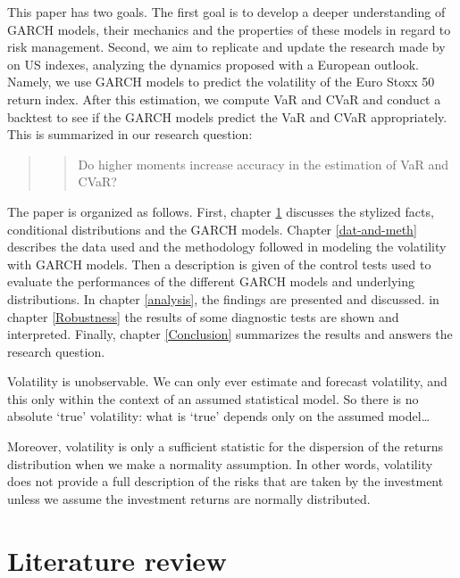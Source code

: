 \documentclass[a4paper, nobind]{templates/ociamthesis}
\begin{document}
\noindent This paper has two goals. The first goal is to develop a deeper understanding of GARCH models, their mechanics and the properties of these models in regard to risk management. Second, we aim to replicate and update the research made by \textcite{bali2008} on US indexes, analyzing the dynamics proposed with a European outlook. Namely, we use GARCH models to predict the volatility of the Euro Stoxx 50 return index. After this estimation, we compute VaR and CVaR and conduct a backtest to see if the GARCH models predict the VaR and CVaR appropriately. This is summarized in our research question:

\begin{quote}
\begin{quote}
Do higher moments increase accuracy in the estimation of VaR and CVaR?
\end{quote}
\end{quote}

\noindent The paper is organized as follows. First, chapter \ref{lit-rev} discusses the stylized facts, conditional distributions and the GARCH models. Chapter \ref{dat-and-meth} describes the data used and the methodology followed in modeling the volatility with GARCH models. Then a description is given of the control tests used to evaluate the performances of the different GARCH models and underlying distributions. In chapter \ref{analysis}, the findings are presented and discussed. in chapter \ref{Robustness} the results of some diagnostic tests are shown and interpreted. Finally, chapter \ref{Conclusion} summarizes the results and answers the research question.

\begin{savequote}
Volatility is unobservable. We can only ever estimate and forecast
volatility, and this only within the context of an assumed statistical
model. So there is no absolute `true' volatility: what is `true' depends
only on the assumed model\ldots{}

Moreover, volatility is only a sufficient statistic for the dispersion
of the returns distribution when we make a normality assumption. In
other words, volatility does not provide a full description of the risks
that are taken by the investment unless we assume the investment returns
are normally distributed.
\end{savequote}



\hypertarget{lit-rev}{%
\chapter{Literature review}\label{lit-rev}}
\end{document}
